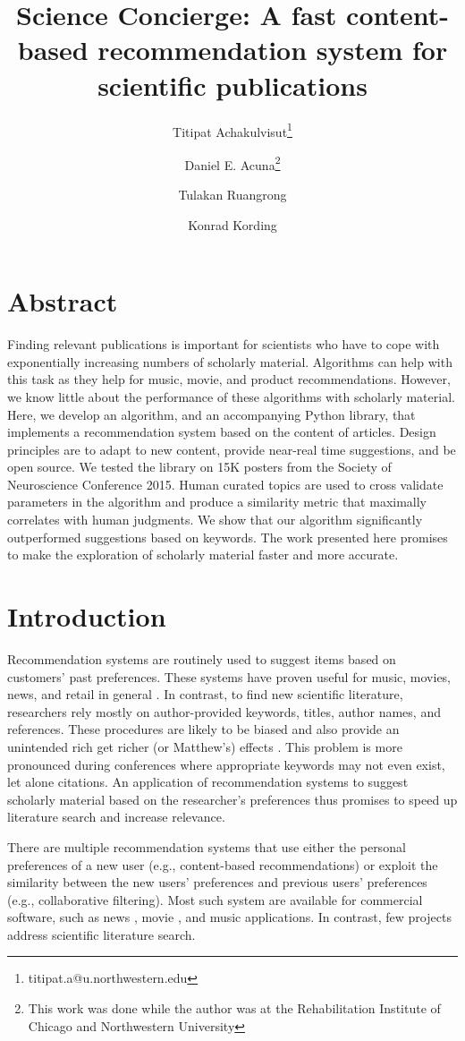 \documentclass[a4paper]{article}
\title{Science Concierge: A fast content-based recommendation system for scientific publications}
\author[1]{Titipat Achakulvisut\thanks{titipat.a@u.northwestern.edu}}
\author[3]{Daniel E. Acuna\thanks{This work was done while the author was at the Rehabilitation Institute of Chicago and Northwestern University}}
\author[4]{Tulakan Ruangrong}
\author[1,2]{Konrad Kording}
\affil[1]{Department of Biomedical Engineering, Northwestern University}
\affil[2]{Sensory Motor Performance Program, Rehabilitation Institute of Chicago}
\affil[3]{School of Information Studies, Syracuse University}
\affil[4]{Department of Biomedical Engineering, Mahidol University}
\begin{document}
\date{}
\maketitle

\section*{Abstract}

Finding relevant publications is important for scientists who have to cope with exponentially increasing numbers of scholarly material. Algorithms can help with this task as they help for music, movie, and product recommendations. However, we know little about the performance of these algorithms with scholarly material. Here, we develop an algorithm, and an accompanying Python library, that implements a recommendation system based on the content of articles. Design principles are to adapt to new content, provide near-real time suggestions, and be open source. We tested the library on 15K posters from the Society of Neuroscience Conference 2015.
Human curated topics are used to cross validate parameters in the algorithm and produce a similarity metric that maximally correlates with human judgments. We show that our algorithm significantly outperformed suggestions based on keywords.
The work presented here promises to make the exploration of scholarly material faster and more accurate.

\section{Introduction}

Recommendation systems are routinely used to suggest items based on customers’ past preferences. These systems have proven useful for music, movies, news, and retail in general \cite{manning2008introduction}. In contrast, to find new scientific literature, researchers rely mostly on author-provided keywords, titles, author names, and references. These procedures are likely to be biased \cite{chavalarias2010science} and also provide an
unintended rich get richer (or Matthew's) effects \cite{petersen2011quantitative}.
This problem is more pronounced during conferences where appropriate keywords may not even exist, let alone citations.
An application of recommendation systems to suggest scholarly material based on the researcher’s preferences thus promises to speed up literature search and increase relevance.

There are multiple recommendation systems that use either the personal preferences of a new user (e.g., content-based recommendations) or exploit the similarity between the new users’ preferences and previous users’ preferences (e.g., collaborative filtering). Most such system are available for commercial software, such as news \cite{li2010contextual}, movie \cite{bell2007lessons}, and music \cite{Ali11parallelcollaborative} applications. In contrast, few projects address scientific literature search.
\end{document}
